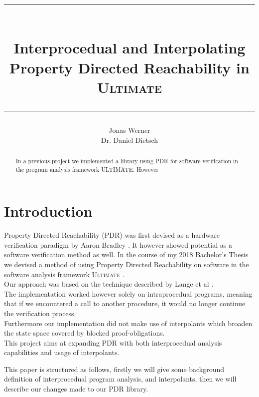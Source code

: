 \documentclass{article}
\newcommand\mycom[1]{}
\newcommand\mycom[1]{#1}
\newcommand{\jw}[1]{\mycom{\todo[color=blue!40,inline]{\small JW: #1}}}
\begin{document}
	\newcommand{\HorizontalLine}{\rule{\linewidth}{0.3mm}}
	
	\title{ \HorizontalLine \\ \textbf{Interprocedual and Interpolating \\ Property Directed Reachability in \textsc{Ultimate}} \HorizontalLine}
	

	
	\author{Jonas Werner \\ Dr. Daniel Dietsch}


	
	\date{} 
	
	\maketitle
	
	\begin{abstract}
	In a previous project we implemented a library using PDR for software verification in the program analysis framework ULTIMATE. However \jw{...}
	\end{abstract}
	
	
	\section{Introduction}
	
	Property Directed Reachability (PDR) was first devised as a hardware verification paradigm by Aaron Bradley \cite{DBLP:conf/vmcai/Bradley11}. It however showed potential as a software verification method as well.
	In the course of my 2018 Bachelor's Thesis we devised a method of using Property Directed Reachability on software in the software analysis framework \textsc{Ultimate} \cite{Zitat02}. \\
	Our approach was based on the technique described by Lange et al \cite{DBLP:conf/date/WelpK13}. \\ The implementation worked however solely on intraprocedual programs, meaning that if we encountered a call to another procedure, it would no longer continue the verification process. \\
	Furthermore our implementation did not make use of interpolants which broaden the state space covered by blocked proof-obligations. \\
	This project aims at expanding PDR with both interprocedual analysis capabilities and usage of interpolants. \jw{\textbf{Both kinds of interpolants: Craig and selfless (citation needed)}} \par
    This paper is structured as follows, firstly we will give some background definition of interprocedual program analysis, and interpolants, then we will describe our changes made to our PDR library.
	
\end{document}

